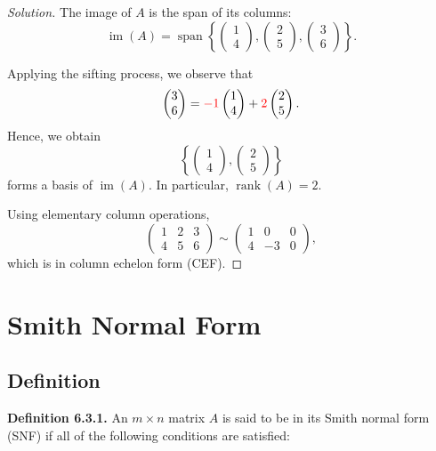 \documentclass[12pt]{article}
\newenvironment{solution}
{\begin{proof}[Solution]}
{\end{proof}}
\begin{document}
\begin{solution}
The image of $A$ is the span of its columns:
\[
\operatorname{im}(A)
=
\operatorname{span}
\left\{
\begin{pmatrix}1\\4\end{pmatrix},
\begin{pmatrix}2\\5\end{pmatrix},
\begin{pmatrix}3\\6\end{pmatrix}
\right\}.
\]

Applying the sifting process, we observe that
\[
\begin{pmatrix}3\\6\end{pmatrix}
=
\textcolor{red}{-1}\begin{pmatrix}1\\4\end{pmatrix}
+
\textcolor{red}{2}\begin{pmatrix}2\\5\end{pmatrix}.
\]
Hence, we obtain
\[
\left\{
\begin{pmatrix}1\\4\end{pmatrix},
\begin{pmatrix}2\\5\end{pmatrix}
\right\}
\]
forms a basis of $\operatorname{im}(A)$. In particular, $\operatorname{rank}(A)=2$.

Using elementary column operations,
\[
\begin{pmatrix}
1&2&3\\
4&5&6
\end{pmatrix}
\sim
\begin{pmatrix}
1&0&0\\
4&-3&0
\end{pmatrix},
\]
which is in column echelon form (CEF).
\end{solution}

\newpage

\section{Smith Normal Form}

\subsection{Definition}
\textbf{Definition 6.3.1.}
An $m\times n$ matrix $A$ is said to be in its
Smith normal form (SNF) if all of the following conditions
are satisfied:
\end{document}
